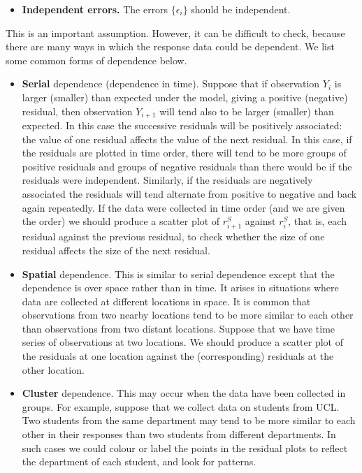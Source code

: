 \documentclass[
  british,
  11pt,
  openany, a4paper]{book}
\providecommand{\tightlist}{%
  \setlength{\itemsep}{0pt}\setlength{\parskip}{0pt}}
\begin{document}
\begin{itemize}
\tightlist
\item
  \textbf{Independent errors.} The errors \(\{\epsilon_i\}\) should be independent.
\end{itemize}

This is an important assumption. However, it can be difficult to check, because there are many ways in which the response data could be dependent. We list some common forms of dependence below.

\begin{itemize}
\item
  \textbf{Serial} dependence (dependence in time). Suppose that if observation \(Y_i\) is larger (smaller) than expected under the model, giving a positive (negative) residual, then observation \(Y_{i+1}\) will tend also to be larger (smaller) than expected. In this case the successive residuals will be positively associated: the value of one residual affects the value of the next residual. In this case, if the residuals are plotted in time order, there will tend to be more groups of positive residuals and groups of negative residuals than there would be if the residuals were independent. Similarly, if the residuals are negatively associated the residuals will tend alternate from positive to negative and back again repeatedly. If the data were collected in time order (and we are given the order) we should produce a scatter plot of \(r^S_{i+1}\) against \(r^S_i\), that is, each residual against the previous residual, to check whether the size of one residual affects the size of the next residual.
\item
  \textbf{Spatial} dependence. This is similar to serial dependence except that the dependence is over space rather than in time. It arises in situations where data are collected at different locations in space. It is common that observations from two nearby locations tend to be more similar to each other than observations from two distant locations. Suppose that we have time series of observations at two locations. We should produce a scatter plot of the residuals at one location against the (corresponding) residuals at the other location.
\item
  \textbf{Cluster} dependence. This may occur when the data have been collected in groups. For example, suppose that we collect data on students from UCL. Two students from the same department may tend to be more similar to each other in their responses than two students from different departments. In such cases we could colour or label the points in the residual plots to reflect the department of each student, and look for patterns.
\end{itemize}
\end{document}
